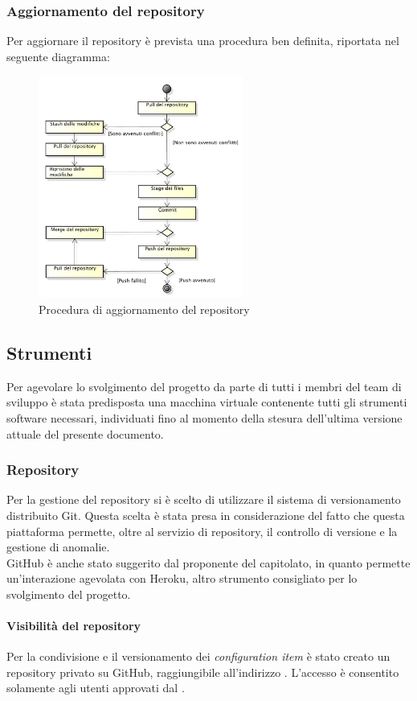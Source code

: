 		\subsubsection{Aggiornamento del repository}
				Per aggiornare il repository è prevista una procedura ben definita, riportata nel seguente diagramma:
				\begin{figure}[H]
					\centering
					\includegraphics[width=0.6\textwidth]{NormeDiProgetto/Pics/Commit}
					\caption{Procedura di aggiornamento del repository}
				\end{figure}
		
	\subsection{Strumenti}
		Per agevolare lo svolgimento del progetto da parte di tutti i membri del team di sviluppo è stata predisposta una macchina virtuale contenente tutti gli strumenti software necessari, individuati fino al momento della stesura dell'ultima versione attuale del presente documento.
		\subsubsection{Repository}\label{sec:SceltaRepository}
			Per la gestione del repository si è scelto di utilizzare il sistema di versionamento distribuito Git. Questa scelta è stata presa in considerazione del fatto che questa piattaforma permette, oltre al servizio di repository, il controllo di versione e la gestione di anomalie. \\
			GitHub è anche stato suggerito dal proponente del capitolato, in quanto permette un'interazione agevolata con Heroku, altro strumento consigliato per lo svolgimento del progetto. 
				\paragraph{Visibilità del repository}
				Per la condivisione e il versionamento dei \textit{configuration item} è stato creato un repository privato su GitHub, raggiungibile all’indirizzo . L’accesso è consentito solamente agli utenti approvati dal .
				